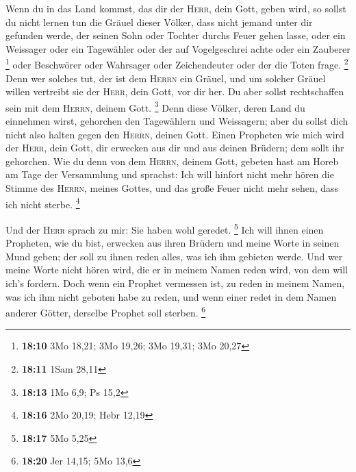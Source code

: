  Wenn du in das Land kommst, das dir der \textsc{Herr},
dein Gott, geben wird, so sollst du nicht lernen tun die Gräuel dieser
Völker,  dass nicht jemand unter dir gefunden werde, der
seinen Sohn oder Tochter durchs Feuer gehen lasse, oder ein Weissager
oder ein Tagewähler oder der auf Vogelgeschrei achte oder ein Zauberer
\footnote{\textbf{18:10} 3Mo 18,21; 3Mo 19,26; 3Mo 19,31; 3Mo 20,27}
 oder Beschwörer oder Wahrsager oder Zeichendeuter oder
der die Toten frage. \footnote{\textbf{18:11} 1Sam 28,11}
 Denn wer solches tut, der ist dem \textsc{Herrn} ein
Gräuel, und um solcher Gräuel willen vertreibt sie der \textsc{Herr},
dein Gott, vor dir her.  Du aber sollst rechtschaffen
sein mit dem \textsc{Herrn}, deinem Gott. \footnote{\textbf{18:13} 1Mo
  6,9; Ps 15,2}  Denn diese Völker, deren Land du
einnehmen wirst, gehorchen den Tagewählern und Weissagern; aber du
sollst dich nicht also halten gegen den \textsc{Herrn}, deinen Gott.
 Einen Propheten wie mich wird der \textsc{Herr}, dein
Gott, dir erwecken aus dir und aus deinen Brüdern; dem sollt ihr
gehorchen.  Wie du denn von dem \textsc{Herrn}, deinem
Gott, gebeten hast am Horeb am Tage der Versammlung und sprachst: Ich
will hinfort nicht mehr hören die Stimme des \textsc{Herrn}, meines
Gottes, und das große Feuer nicht mehr sehen, dass ich nicht sterbe.
\footnote{\textbf{18:16} 2Mo 20,19; Hebr 12,19}

 Und der \textsc{Herr} sprach zu mir: Sie haben wohl
geredet. \footnote{\textbf{18:17} 5Mo 5,25}  Ich will
ihnen einen Propheten, wie du bist, erwecken aus ihren Brüdern und meine
Worte in seinen Mund geben; der soll zu ihnen reden alles, was ich ihm
gebieten werde.  Und wer meine Worte nicht hören wird,
die er in meinem Namen reden wird, von dem will ich's fordern.
 Doch wenn ein Prophet vermessen ist, zu reden in meinem
Namen, was ich ihm nicht geboten habe zu reden, und wenn einer redet in
dem Namen anderer Götter, derselbe Prophet soll sterben. \footnote{\textbf{18:20}
  Jer 14,15; 5Mo 13,6}

